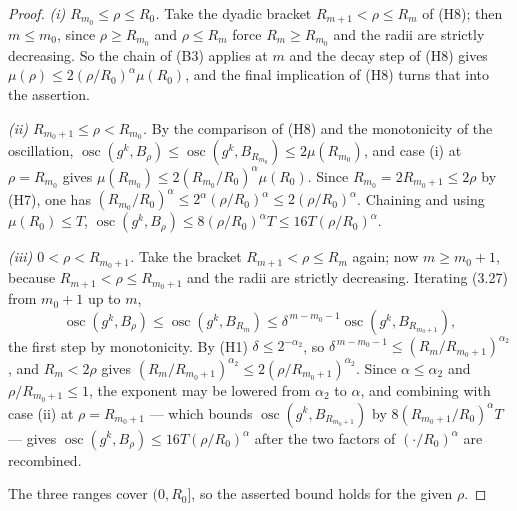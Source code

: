 \begin{proof}
\emph{(i) $R_{m_0}\le\rho\le R_0$.}  Take the dyadic bracket
$R_{m+1}<\rho\le R_m$ of (H8); then $m\le m_0$, since $\rho\ge R_{m_0}$ and
$\rho\le R_m$ force $R_m\ge R_{m_0}$ and the radii are strictly decreasing.  So
the chain of (B3) applies at $m$ and the decay step of (H8) gives
$\mu(\rho)\le2(\rho/R_0)^{\alpha}\mu(R_0)$, and the final implication of (H8)
turns that into the assertion.

\emph{(ii) $R_{m_0+1}\le\rho<R_{m_0}$.}  By the comparison of (H8) and the
monotonicity of the oscillation,
$\operatorname*{osc}(g^k,B_\rho)\le\operatorname*{osc}(g^k,B_{R_{m_0}})
\le2\mu(R_{m_0})$, and case (i) at $\rho=R_{m_0}$ gives
$\mu(R_{m_0})\le2(R_{m_0}/R_0)^{\alpha}\mu(R_0)$.  Since
$R_{m_0}=2R_{m_0+1}\le2\rho$ by (H7), one has
$(R_{m_0}/R_0)^{\alpha}\le2^{\alpha}(\rho/R_0)^{\alpha}\le2(\rho/R_0)^{\alpha}$.
Chaining and using $\mu(R_0)\le T$,
$\operatorname*{osc}(g^k,B_\rho)\le8(\rho/R_0)^{\alpha}T\le16T(\rho/R_0)^{\alpha}$.

\emph{(iii) $0<\rho<R_{m_0+1}$.}  Take the bracket $R_{m+1}<\rho\le R_m$ again;
now $m\ge m_0+1$, because $R_{m+1}<\rho\le R_{m_0+1}$ and the radii are
strictly decreasing.  Iterating (3.27) from $m_0+1$ up to $m$,
\[
\operatorname*{osc}(g^k,B_\rho)\le\operatorname*{osc}(g^k,B_{R_m})
\le\delta^{\,m-m_0-1}\operatorname*{osc}(g^k,B_{R_{m_0+1}}),
\]
the first step by monotonicity.  By (H1) $\delta\le2^{-\alpha_2}$, so
$\delta^{\,m-m_0-1}\le(R_m/R_{m_0+1})^{\alpha_2}$, and $R_m<2\rho$ gives
$(R_m/R_{m_0+1})^{\alpha_2}\le2(\rho/R_{m_0+1})^{\alpha_2}$.  Since
$\alpha\le\alpha_2$ and $\rho/R_{m_0+1}\le1$, the exponent may be lowered from
$\alpha_2$ to $\alpha$, and combining with case (ii) at $\rho=R_{m_0+1}$ --- which
bounds $\operatorname*{osc}(g^k,B_{R_{m_0+1}})$ by
$8(R_{m_0+1}/R_0)^{\alpha}T$ --- gives
$\operatorname*{osc}(g^k,B_\rho)\le16T(\rho/R_0)^{\alpha}$ after the two factors
of $(\cdot/R_0)^\alpha$ are recombined.

The three ranges cover $(0,R_0]$, so the asserted bound holds for the given
$\rho$.
\end{proof}
